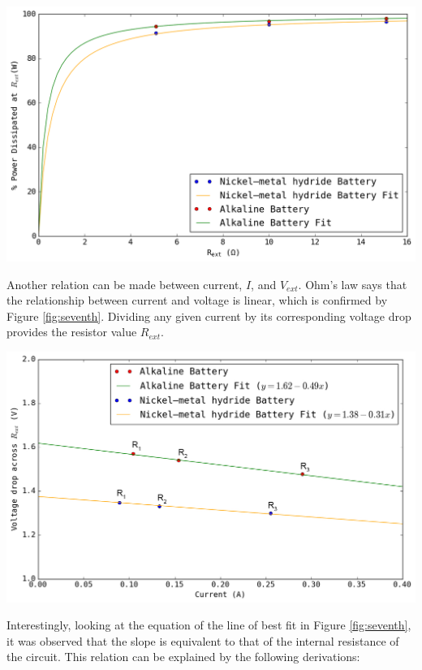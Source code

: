 \documentclass[journal]{IEEEtran}
\begin{document}
\begingroup
    \medskip
    \centering
    \includegraphics[width = \columnwidth]{images/lab3_graph1_2.png}
    \label{fig:ninth}
    \medskip
\endgroup


\noindent Another relation can be made between current, $I$, and $V_{ext}$. Ohm's law says that the relationship between current and voltage is linear, which is confirmed by Figure \ref{fig:seventh}. Dividing any given current by its corresponding voltage drop provides the resistor value $R_{ext}$.

\begingroup
    \medskip
    \centering
    \includegraphics[width =\columnwidth]{images/lab3_graph2.jpg}
    \label{fig:seventh}
    \medskip
\endgroup

\noindent Interestingly, looking at the equation of the line of best fit in Figure \ref{fig:seventh}, it was observed that the slope is equivalent to that of the internal resistance of the circuit. This relation can be explained by the following derivations: 
\end{document}
